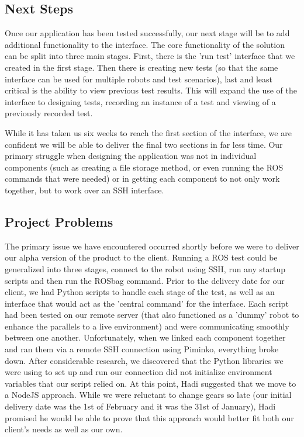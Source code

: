 \documentclass[onecolumn, draftclsnofoot,10pt, compsoc]{IEEEtran}
\begin{document}
\subsection{Next Steps}
Once our application has been tested successfully, our next stage will be to add additional functionality to the interface. The core functionality of the solution can be split into three main stages. First, there is the 'run test' interface that we created in the first stage. Then there is creating new tests (so that the same interface can be used for multiple robots and test scenarios), last and least critical is the ability to view previous test results. This will expand the use of the interface to designing tests, recording an instance of a test and viewing of a previously recorded test.

While it has taken us six weeks to reach the first section of the interface, we are confident we will be able to deliver the final two sections in far less time. Our primary struggle when designing the application was not in individual components (such as creating a file storage method, or even running the ROS commands that were needed) or in getting each component to not only work together, but to work over an SSH interface. 

\subsection{Project Problems}
The primary issue we have encountered occurred shortly before we were to deliver our alpha version of the product to the client. Running a ROS test could be generalized into three stages, connect to the robot using SSH, run any startup scripts and then run the ROSbag command. Prior to the delivery date for our client, we had Python scripts to handle each stage of the test, as well as an interface that would act as the 'central command' for the interface. Each script had been tested on our remote server (that also functioned as a 'dummy' robot to enhance the parallels to a live environment) and were communicating smoothly between one another. Unfortunately, when we linked each component together and ran them via a remote SSH connection using Piminko, everything broke down. After considerable research, we discovered that the Python libraries we were using to set up and run our connection did not initialize environment variables that our script relied on. At this point, Hadi suggested that we move to a NodeJS approach. While we were reluctant to change gears so late (our initial delivery date was the 1st of February and it was the 31st of January), Hadi promised he would be able to prove that this approach would better fit both our client's needs as well as our own. 
\end{document}
